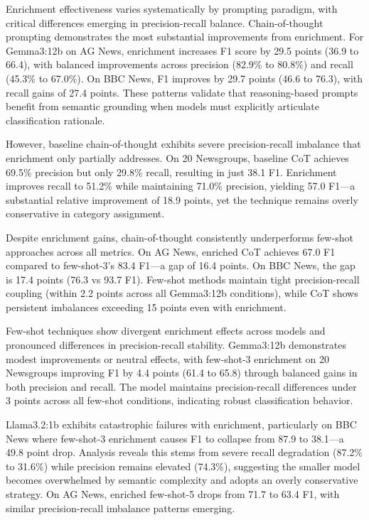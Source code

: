 \documentclass[sigconf,nonacm]{acmart}
\begin{document}
Enrichment effectiveness varies systematically by prompting paradigm, with critical differences emerging in precision-recall balance. Chain-of-thought prompting demonstrates the most substantial improvements from enrichment. For Gemma3:12b on AG News, enrichment increases F1 score by 29.5 points (36.9 to 66.4), with balanced improvements across precision (82.9\% to 80.8\%) and recall (45.3\% to 67.0\%). On BBC News, F1 improves by 29.7 points (46.6 to 76.3), with recall gains of 27.4 points. These patterns validate that reasoning-based prompts benefit from semantic grounding when models must explicitly articulate classification rationale.

However, baseline chain-of-thought exhibits severe precision-recall imbalance that enrichment only partially addresses. On 20 Newsgroups, baseline CoT achieves 69.5\% precision but only 29.8\% recall, resulting in just 38.1 F1. Enrichment improves recall to 51.2\% while maintaining 71.0\% precision, yielding 57.0 F1—a substantial relative improvement of 18.9 points, yet the technique remains overly conservative in category assignment.

Despite enrichment gains, chain-of-thought consistently underperforms few-shot approaches across all metrics. On AG News, enriched CoT achieves 67.0 F1 compared to few-shot-3's 83.4 F1—a gap of 16.4 points. On BBC News, the gap is 17.4 points (76.3 vs 93.7 F1). Few-shot methods maintain tight precision-recall coupling (within 2.2 points across all Gemma3:12b conditions), while CoT shows persistent imbalances exceeding 15 points even with enrichment.

Few-shot techniques show divergent enrichment effects across models and pronounced differences in precision-recall stability. Gemma3:12b demonstrates modest improvements or neutral effects, with few-shot-3 enrichment on 20 Newsgroups improving F1 by 4.4 points (61.4 to 65.8) through balanced gains in both precision and recall. The model maintains precision-recall differences under 3 points across all few-shot conditions, indicating robust classification behavior.

Llama3.2:1b exhibits catastrophic failures with enrichment, particularly on BBC News where few-shot-3 enrichment causes F1 to collapse from 87.9 to 38.1—a 49.8 point drop. Analysis reveals this stems from severe recall degradation (87.2\% to 31.6\%) while precision remains elevated (74.3\%), suggesting the smaller model becomes overwhelmed by semantic complexity and adopts an overly conservative strategy. On AG News, enriched few-shot-5 drops from 71.7 to 63.4 F1, with similar precision-recall imbalance patterns emerging.
\end{document}
